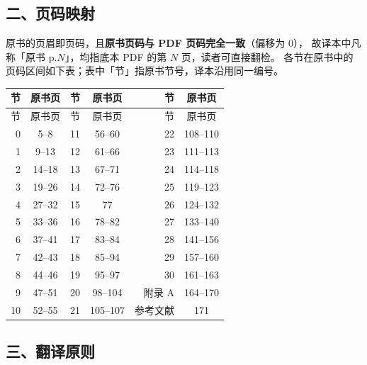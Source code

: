 \subsection*{二、页码映射}

原书的页眉即页码，且\textbf{原书页码与 PDF 页码完全一致}（偏移为 0），
故译本中凡称「原书 p.\(N\)」，均指底本 PDF 的第 \(N\) 页，读者可直接翻检。
各节在原书中的页码区间如下表；表中「节」指原书节号，译本沿用同一编号。

\begin{center}
\small
\begin{longtable}{rc@{\hspace{2.2em}}rc@{\hspace{2.2em}}rc}
\toprule
节 & 原书页 & 节 & 原书页 & 节 & 原书页\\
\midrule
\endfirsthead
\toprule
节 & 原书页 & 节 & 原书页 & 节 & 原书页\\
\midrule
\endhead
0 & 5--8 & 11 & 56--60 & 22 & 108--110\\
1 & 9--13 & 12 & 61--66 & 23 & 111--113\\
2 & 14--18 & 13 & 67--71 & 24 & 114--118\\
3 & 19--26 & 14 & 72--76 & 25 & 119--123\\
4 & 27--32 & 15 & 77 & 26 & 124--132\\
5 & 33--36 & 16 & 78--82 & 27 & 133--140\\
6 & 37--41 & 17 & 83--84 & 28 & 141--156\\
7 & 42--43 & 18 & 85--94 & 29 & 157--160\\
8 & 44--46 & 19 & 95--97 & 30 & 161--163\\
9 & 47--51 & 20 & 98--104 & 附录 A & 164--170\\
10 & 52--55 & 21 & 105--107 & 参考文献 & 171\\
\bottomrule
\end{longtable}
\end{center}

\subsection*{三、翻译原则}

